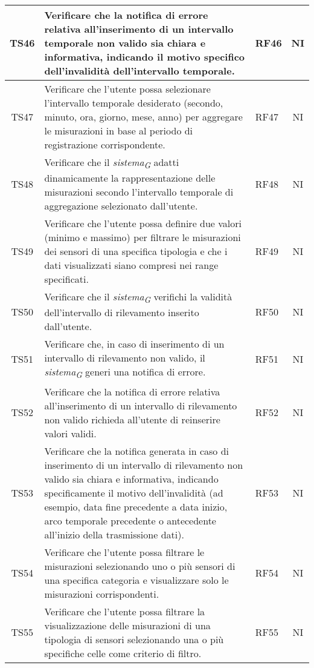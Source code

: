 \begin{longtable}{|c|p{5cm}|>{\raggedright}p{2cm}|c|}
        \hline
        TS46 & Verificare che la notifica di errore relativa all'inserimento di un intervallo temporale non valido sia chiara e informativa, indicando il motivo specifico dell'invalidità dell'intervallo temporale. & RF46 & NI \\
        \hline
        TS47 & Verificare che l'utente possa selezionare l'intervallo temporale desiderato (secondo, minuto, ora, giorno, mese, anno) per aggregare le misurazioni in base al periodo di registrazione corrispondente. & RF47 & NI \\
        \hline
        TS48 & Verificare che il \textit{sistema}\textsubscript{\textit{G}} adatti dinamicamente la rappresentazione delle misurazioni secondo l'intervallo temporale di aggregazione selezionato dall'utente. & RF48 & NI \\
        \hline
        TS49 & Verificare che l'utente possa definire due valori (minimo e massimo) per filtrare le misurazioni dei sensori di una specifica tipologia e che i dati visualizzati siano compresi nei range specificati. & RF49 & NI \\
        \hline
        TS50 & Verificare che il \textit{sistema}\textsubscript{\textit{G}} verifichi la validità dell'intervallo di rilevamento inserito dall'utente. & RF50 & NI \\
        \hline
        TS51 & Verificare che, in caso di inserimento di un intervallo di rilevamento non valido, il \textit{sistema}\textsubscript{\textit{G}} generi una notifica di errore. & RF51 & NI \\
        \hline
        TS52 & Verificare che la notifica di errore relativa all'inserimento di un intervallo di rilevamento non valido richieda all'utente di reinserire valori validi. & RF52 & NI \\
        \hline
        TS53 & Verificare che la notifica generata in caso di inserimento di un intervallo di rilevamento non valido sia chiara e informativa, indicando specificamente il motivo dell'invalidità (ad esempio, data fine precedente a data inizio, arco temporale precedente o antecedente all’inizio della trasmissione dati). & RF53 & NI \\
        \hline
        TS54 & Verificare che l'utente possa filtrare le misurazioni selezionando uno o più sensori di una specifica categoria e visualizzare solo le misurazioni corrispondenti. & RF54 & NI \\
        \hline
        TS55 & Verificare che l'utente possa filtrare la visualizzazione delle misurazioni di una tipologia di sensori selezionando una o più specifiche celle come criterio di filtro. & RF55 & NI \\

\end{longtable}
